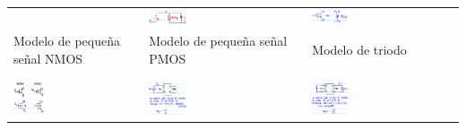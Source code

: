 \documentclass[10pt]{article}
\begin{document}
\begin{table}
\begin{tabular}{|p{}|p{}|p{}|}
		                                                                                                & \includegraphics[width=0.25\textwidth, keepaspectratio]{smallsignal-pmos}
		                                                                                                & \includegraphics[width=0.25\textwidth, keepaspectratio]{smallsignal-triode}                                           \\
		Modelo de pequeña señal NMOS\tablefootnote{$g_m = \frac{i_d}{v_{gs}} \implies i_d = g_mv_{gs}$} & Modelo de pequeña señal PMOS                                                                   & Modelo de triodo     \\
		                                                                                                &                                                                                                                       \\
		\hline
		                                                                                                &                                                                                                                       \\
		\includegraphics[width=0.25\textwidth, keepaspectratio]{symbols}
		                                                                                                & \includegraphics[width=0.25\textwidth, keepaspectratio]{input-impedance}
		                                                                                                & \includegraphics[width=0.25\textwidth, keepaspectratio]{output-impedance}                                             \\

\end{tabular}
\end{table}
\end{document}
